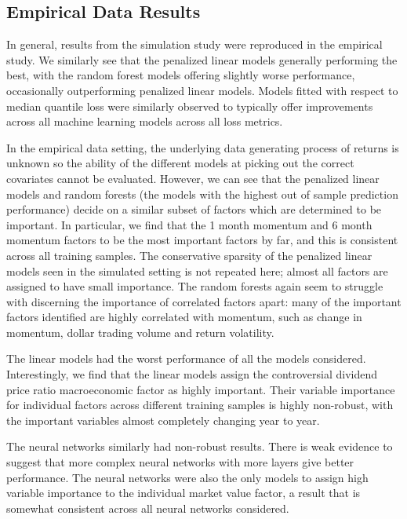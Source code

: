 \documentclass[11pt, a4paper, table]{article}
\begin{document}
\newpage

\subsection{Empirical Data Results}


In general, results from the simulation study were reproduced in the empirical study. We similarly see that the penalized linear models generally performing the best, with the random forest models offering slightly worse performance, occasionally outperforming penalized linear models. Models fitted with respect to median quantile loss were similarly observed to typically offer improvements across all machine learning models across all loss metrics.


In the empirical data setting, the underlying data generating process of returns is unknown so the ability of the different models at picking out the correct covariates cannot be evaluated. However, we can see that the penalized linear models and random forests (the models with the highest out of sample prediction performance) decide on a similar subset of factors which are determined to be important. In particular, we find that the 1 month momentum and 6 month momentum factors to be the most important factors by far, and this is consistent across all training samples. The conservative sparsity of the penalized linear models seen in the simulated setting is not repeated here; almost all factors are assigned to have small importance. The random forests again seem to struggle with discerning the importance of correlated factors apart: many of the important factors identified are highly correlated with momentum, such as change in momentum, dollar trading volume and return volatility.

The linear models had the worst performance of all the models considered. Interestingly, we find that the linear models assign the controversial dividend price ratio macroeconomic factor as highly important. Their variable importance for individual factors across different training samples is highly non-robust, with the important variables almost completely changing year to year.

The neural networks similarly had non-robust results. There is weak evidence to suggest that more complex neural networks with more layers give better performance. The neural networks were also the only models to assign high variable importance to the individual market value factor, a result that is somewhat consistent across all neural networks considered. 
\end{document}

